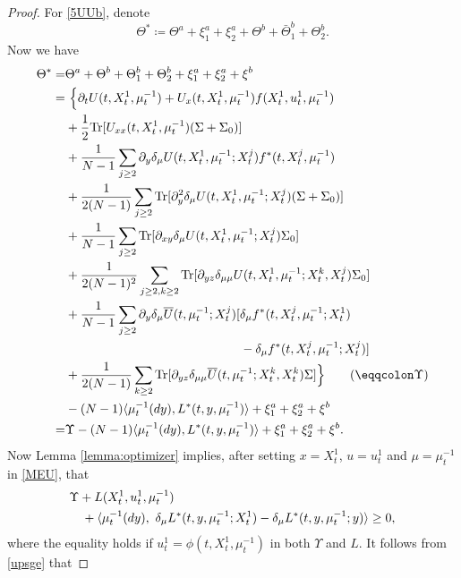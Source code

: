 \documentclass{amsart}
\theoremstyle{definition}
\theoremstyle{remark}
\numberwithin{equation}{section}
\begin{document}
\begin{proof}
For \eqref{5UUb}, denote
$$
\Theta^*\coloneqq \Theta^a+\xi_1^a+\xi_2^a+\Theta^b+ \bar \Theta^b_1+ \Theta^b_2.
$$
Now we have
\begin{align*}
  \Theta^*
=& \Theta^a+\Theta^b+  \Theta^b_1+ \Theta^b_2+ \xi_1^a+\xi_2^a+\xi^b  \\
 =&\ \Big\{ \partial_t U(t, X^1_t, \mu_t^{-1}) + U_{x}(t, X^1_t, \mu_t^{-1}) f(X_t^1, u^1_t, \mu_t^{-1})  \\
& +\frac{1}{2} {\rm Tr}[ U_{xx}(t, X^1_t, \mu_t^{-1}) (\Sigma+ \Sigma_0)] \\
&+ \frac{1}{N-1}\sum_{j\ge 2} \partial_{y}\delta_\mu U(t, X^1_t,\mu_t^{-1}; X^j_t)f^*(t, X_t^j, \mu_t^{-1})  \\
& + \frac{1}{2(N-1)}\sum_{j\ge 2 }{\rm Tr}[ \partial_{y}^2\delta_\mu U(t, X^1_t,\mu_t^{-1}; X^j_t)(\Sigma+\Sigma_0) ] \\
&  + \frac{1}{N-1}\sum_{j\ge 2  }{\rm Tr}[ \partial_{xy}\delta_\mu U(t, X^1_t,\mu_t^{-1}; X^j_t)\Sigma_0 ]\\
&+   \frac{1}{2(N-1)^2}\sum_{j\ge 2,k\ge 2  } {\rm Tr}[\partial_{yz}
\delta_{\mu\mu}
U(t, X^1_t,\mu_t^{-1};X_t^k, X^j_t)\Sigma_0 ]\\
& + \frac{1}{N-1} \sum_{j\ge 2} \partial_{y}\delta_\mu \overline U(t, \mu_t^{-1}; X^j_t) [   \delta_\mu f^*(t, X_t^j, \mu_t^{-1}; X_t^1)\\
&\qquad\qquad\qquad\qquad\qquad\qquad\qquad - \delta_\mu f^*(t, X_t^j, \mu_t^{-1}; X_t^j) ]\\
& + \frac{1}{2(N-1)}\sum_{k\ge 2  } {\rm Tr}[ \partial_{yz}
\delta_{\mu\mu}
\overline U(t,\mu_t^{-1};X_t^k, X^k_t)\Sigma]\Big\} \qquad (\eqqcolon\Upsilon)
 \notag \\
 & -(N-1)\langle \mu_t^{-1}(dy), L^*(t, y, \mu_t^{-1}) \rangle + \xi_1^a+\xi_2^a +  \xi^b\\
  =& \Upsilon -(N-1)\langle \mu_t^{-1}(dy), L^*(t, y, \mu_t^{-1}) \rangle +\xi_1^a+\xi_2^a   + \xi^b.
\end{align*} %
Now  Lemma \ref{lemma:optimizer} implies, after setting $x=X_t^1$, $u=u_t^1$ and $\mu=\mu_t^{-1}$ in \eqref{MEU}, that
\begin{align}
&\Upsilon +  L(X_t^1, u_t^1, \mu_t^{-1}) \label{upsge} \\
&\quad+  \langle \mu_t^{-1}(dy) , \   \delta_\mu L^* (t,y,\mu_t^{-1}; X_t^1) - \delta_\mu L^*(t,y,\mu_t^{-1}; y) \rangle\ge0,
\notag
\end{align}
where the equality holds if
$u_t^1=\phi(t, X_t^1, \mu_t^{-1})$  in both  $\Upsilon $ and $L$.
It follows from \eqref{upsge} that

\end{proof}
\end{document}
